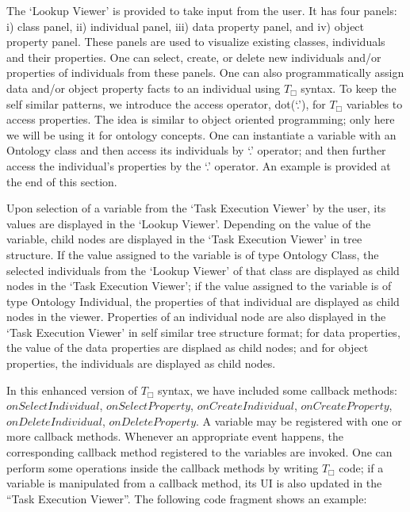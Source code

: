 \documentclass[a4paper]{llncs}
\begin{document}
The `Lookup Viewer' is provided to take input from the user. It has four panels: i) class panel, ii) individual panel, iii) data property panel, and iv) object property panel. These panels are used to visualize existing classes, individuals and their properties. One can select, create, or delete new individuals and/or properties of individuals from these panels. 
One can also programmatically assign data and/or object property facts to an individual using $T_{\Box}$ syntax. 
To keep the self similar patterns, we introduce the access operator, dot(`.'), for $T_{\Box}$ variables to access properties. 
The idea is similar to object oriented programming; only here we will be using it for ontology concepts. 
One can instantiate a variable with an Ontology class and then access its individuals by `.' operator; 
and then further access the individual's properties by the `.' operator. An example is provided at the end of this section. 

Upon selection of a variable from the `Task Execution Viewer' by the user, its values are displayed in the `Lookup Viewer'. 
Depending on the value of the variable, child nodes are displayed in the `Task Execution Viewer' in tree structure. 
If the value assigned to the variable is of type Ontology Class, the selected individuals from the `Lookup Viewer' of that class are displayed as child nodes in the `Task Execution Viewer';
if the value assigned to the variable is of type Ontology Individual, the properties of that individual are displayed as child nodes in the viewer.
Properties of an individual node are also displayed in the `Task Execution Viewer' in self similar tree structure format;
for data properties, the value of the data properties are displaed as child nodes; 
and for object properties, the individuals are displayed as child nodes. 

In this enhanced version of $T_{\Box}$ syntax, we have included some callback methods: $onSelectIndividual$, $onSelectProperty$, $onCreateIndividual$, $onCreateProperty$, $onDeleteIndividual$, $onDeleteProperty$. 
A variable may be registered with one or more callback methods. 
Whenever an appropriate event happens, the corresponding callback method registered to the variables are invoked. 
One can perform some operations inside the callback methods by writing $T_{\Box}$ code; if a variable is manipulated from a callback method, its UI is also updated in the ``Task Execution Viewer''. The following code fragment shows an example:
\end{document}
